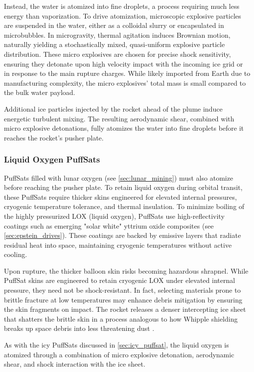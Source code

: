 \documentclass{article}
\begin{document}
Instead, the water is atomized into fine droplets, a process requiring much less energy than vaporization. To drive atomization, microscopic explosive particles are suspended in the water, either as a colloidal slurry or encapsulated in microbubbles. In microgravity, thermal agitation induces Brownian motion, naturally yielding a stochastically mixed, quasi-uniform explosive particle distribution. These micro explosives are chosen for precise shock sensitivity, ensuring they detonate upon high velocity impact with the incoming ice grid or in response to the main rupture charges. While likely imported from Earth due to manufacturing complexity, the micro explosives' total mass is small compared to the bulk water payload.

Additional ice particles injected by the rocket ahead of the plume induce energetic turbulent mixing. The resulting aerodynamic shear, combined with micro explosive detonations, fully atomizes the water into fine droplets before it reaches the rocket’s pusher plate.

\subsubsection{Liquid Oxygen PuffSats}
PuffSats filled with lunar oxygen (see \autoref{sec:lunar_mining}) must also atomize before reaching the pusher plate. To retain liquid oxygen during orbital transit, these PuffSats require thicker skins engineered for elevated internal pressures, cryogenic temperature tolerance, and thermal insulation. To minimize boiling of the highly pressurized LOX (liquid oxygen), PuffSats use high-reflectivity coatings such as emerging "solar white" yttrium oxide composites (see \autoref{sec:epstein_drives}).  These coatings are backed by emissive layers that radiate residual heat into space, maintaining cryogenic temperatures without active cooling.

Upon rupture, the thicker balloon skin risks becoming hazardous shrapnel. While PuffSat skins are engineered to retain cryogenic LOX under elevated internal pressure, they need not be shock-resistant. In fact, selecting materials prone to brittle fracture at low temperatures may enhance debris mitigation by ensuring the skin fragments on impact. The rocket releases a denser intercepting ice sheet that shatters the brittle skin in a process analogous to how Whipple shielding breaks up space debris into less threatening dust \cite{whipple_shield}.

As with the icy PuffSats discussed in \autoref{sec:icy_puffsat}, the liquid oxygen is atomized through a combination of micro explosive detonation, aerodynamic shear, and shock interaction with the ice sheet.
\end{document}
